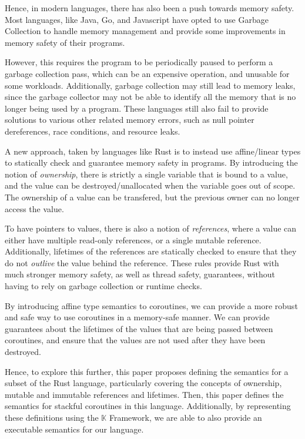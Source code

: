 \documentclass[review,twocolumn]{sigplanconf}
\begin{document}
Hence, in modern languages, there has also been a push towards memory safety. Most languages, like Java, Go, and Javascript have opted to use Garbage Collection to handle memory management and provide some improvements in memory safety of their programs.

However, this requires the program to be periodically paused to perform a garbage collection pass, which can be an expensive operation, and unusable for some workloads. Additionally, garbage collection may still lead to memory leaks, since the garbage collector may not be able to identify all the memory that is no longer being used by a program. These languages still also fail to provide solutions to various other related memory errors, such as null pointer dereferences, race conditions, and resource leaks.

A new approach, taken by languages like Rust is to instead use affine/linear types to statically check and guarantee memory safety in programs. By introducing the notion of \textit{ownership}, there is strictly a single variable that is bound to a value, and the value can be destroyed/unallocated when the variable goes out of scope. The ownership of a value can be transfered, but the previous owner can no longer access the value.

To have pointers to values, there is also a notion of \textit{references}, where a value can either have multiple read-only references, or a single mutable reference. Additionally, lifetimes of the references are statically checked to ensure that they do not \textit{outlive} the value behind the reference. These rules provide Rust with much stronger memory safety, as well as thread safety, guarantees, without having to rely on garbage collection or runtime checks.


By introducing affine type semantics to coroutines, we can provide a more robust and safe way to use coroutines in a memory-safe manner. We can provide guarantees about the lifetimes of the values that are being passed between coroutines, and ensure that the values are not used after they have been destroyed.

Hence, to explore this further, this paper proposes defining the semantics for a subset of the Rust language, particularly covering the concepts of ownership, mutable and immutable references and lifetimes. Then, this paper defines the semantics for stackful coroutines in this language. Additionally, by representing these definitions using the $\mathbb{K}$ Framework, we are able to also provide an executable semantics for our language.
\end{document}
